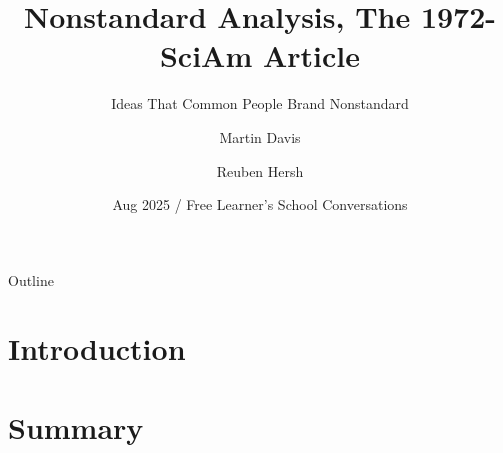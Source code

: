 \documentclass{beamer}
\title[Nonstandard Analysis] %
{Nonstandard Analysis, The 1972-SciAm Article}
\subtitle
{Ideas That Common People Brand Nonstandard} %
\author[MD,RH,KM] %
{Martin Davis\inst{1} \and Reuben Hersh\inst{2}}
\institute[Unknown] %
{
  \inst{1}%
  Original Author
  \and
  \inst{2}%
  Original Author
  }
\date[August 2025] %
{Aug 2025 / Free Learner's School Conversations}
\begin{document}
\begin{frame}
  \titlepage
\end{frame}

\begin{frame}{Outline}
  \tableofcontents
\end{frame}




\section{Introduction}



























\section{Summary}


\end{document}
